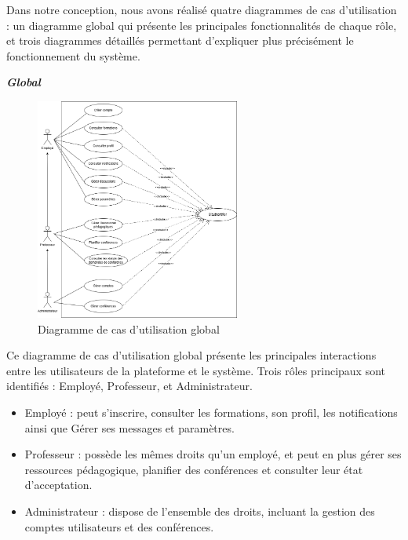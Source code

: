 \documentclass{article}
\begin{document}
\vspace{0,5cm}
 \hspace*{2em} Dans notre conception, nous avons réalisé quatre diagrammes de cas d’utilisation : un diagramme global qui présente les principales fonctionnalités de chaque rôle, et trois diagrammes détaillés permettant d’expliquer plus précisément le fonctionnement du système.
\begin{center}
     \textbf{\textit{Global}}
\end{center}
\begin{figure}[H]
  \centering
  \includegraphics[width=0.6\textwidth]{global(1.2).drawio.png}
  \caption{Diagramme de cas d’utilisation global}
  \label{fig:globalusecase}
\end{figure}
Ce diagramme de cas d’utilisation global présente les principales interactions entre les utilisateurs de la plateforme et le système. Trois rôles principaux sont identifiés : Employé, Professeur, et Administrateur.
\begin{itemize}

\item Employé : peut s’inscrire, consulter les formations, son profil, les notifications ainsi que Gérer ses messages et paramètres.
\item Professeur : possède les mêmes droits qu’un employé, et peut en plus gérer ses ressources pédagogique, planifier des conférences et consulter leur état d’acceptation.
\item Administrateur : dispose de l’ensemble des droits, incluant la gestion des comptes utilisateurs et des conférences.

\end{itemize}
\end{document}
